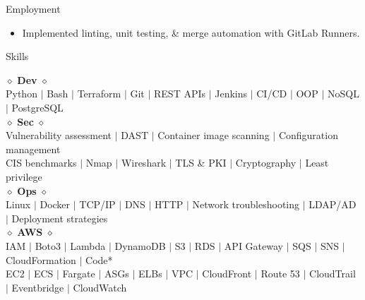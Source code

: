 \documentclass{resume} %
\begin{document}
{\begin{rSection}{Employment}
\begin{itemize}
			\vspace{-0.2cm} \item Implemented linting, unit testing, \& merge automation with GitLab Runners.
		\end{itemize}
	\vspace{-3ex}
	\end{rSection}
		\begin{rSection}{Skills}
			\begin{center}
				\vspace{-0.1cm}$\diamond$ {\bf Dev }$\diamond$ \\
				Python $\mid$ Bash $\mid$ Terraform $\mid$ Git $\mid$ REST APIs $\mid$ Jenkins $\mid$ CI/CD $\mid$ OOP $\mid$ NoSQL $\mid$ PostgreSQL\\
				
				$\diamond$ {\bf Sec} $\diamond$ \\
				Vulnerability assessment $\mid$ DAST $\mid$ Container image scanning $\mid$ Configuration management
				\\CIS benchmarks $\mid$ Nmap $\mid$ Wireshark $\mid$  TLS \& PKI $\mid$ Cryptography $\mid$ Least privilege\\
				
				$\diamond$ {\bf Ops} $\diamond$ \\
				Linux $\mid$ Docker $\mid$ TCP/IP $\mid$ DNS $\mid$ HTTP $\mid$ Network troubleshooting  $\mid$ LDAP/AD $\mid$ Deployment strategies\\
				
				$\diamond$ {\bf AWS} $\diamond$ \\ IAM $\mid$ Boto3 $\mid$ Lambda $\mid$ DynamoDB $\mid$ S3 $\mid$ RDS $\mid$ API Gateway $\mid$ SQS $\mid$ SNS $\mid$ CloudFormation $\mid$ Code*\\ EC2 $\mid$ ECS $\mid$ Fargate $\mid$ ASGs $\mid$ ELBs $\mid$ VPC $\mid$ CloudFront $\mid$ Route 53 $\mid$ CloudTrail $\mid$ Eventbridge $\mid$ CloudWatch  \\
				

\end{center}
\end{rSection}}
\end{document}
